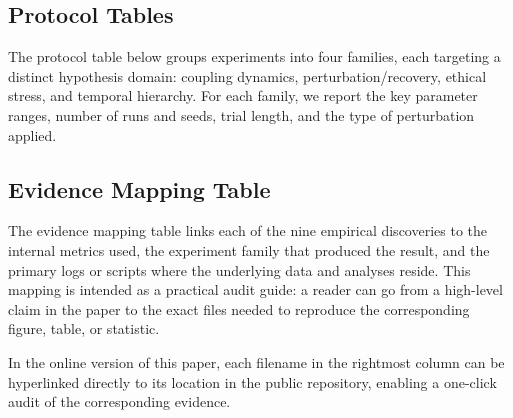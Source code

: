 \documentclass[11pt,a4paper]{article}
\begin{document}
\subsection{Protocol Tables}

The protocol table below groups experiments into four families, each targeting a distinct
hypothesis domain: coupling dynamics, perturbation/recovery, ethical stress, and temporal
hierarchy. For each family, we report the key parameter ranges, number of runs and seeds,
trial length, and the type of perturbation applied.

\begin{table}[H]
\centering
\caption{Experiment Families}
\renewcommand{\arraystretch}{1.50}
\end{table}

\subsection{Evidence Mapping Table}

The evidence mapping table links each of the nine empirical discoveries to the internal
metrics used, the experiment family that produced the result, and the primary logs or
scripts where the underlying data and analyses reside. This mapping is intended as a
practical audit guide: a reader can go from a high-level claim in the paper to the exact
files needed to reproduce the corresponding figure, table, or statistic.

In the online version of this paper, each filename in the rightmost column can be
hyperlinked directly to its location in the public repository, enabling a one-click audit
of the corresponding evidence.
\end{document}
